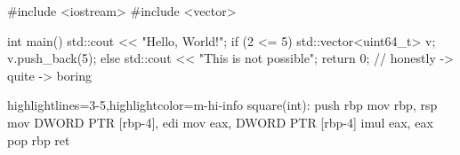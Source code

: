 \documentclass[main.tex]{subfiles}
\begin{document}

\obrazek
{} %

\obrazek
\begin{cppcode}
    #include <iostream>
    #include <vector>

    int main() {
        std::cout << "Hello, World!";
        if (2 <= 5) {
            std::vector<uint64_t> v;
            v.push_back(5);
        } else {
            std::cout << "This is not possible";
        }
        return 0;
    }
    // honestly -> quite -> boring
\end{cppcode}
\obrazek
\begin{asmcode*}{highlightlines={3-5},highlightcolor=m-hi-info}
    square(int):
            push    rbp
            mov     rbp, rsp
            mov     DWORD PTR [rbp-4], edi
            mov     eax, DWORD PTR [rbp-4]
            imul    eax, eax
            pop     rbp
            ret
\end{asmcode*}
\end{document}

